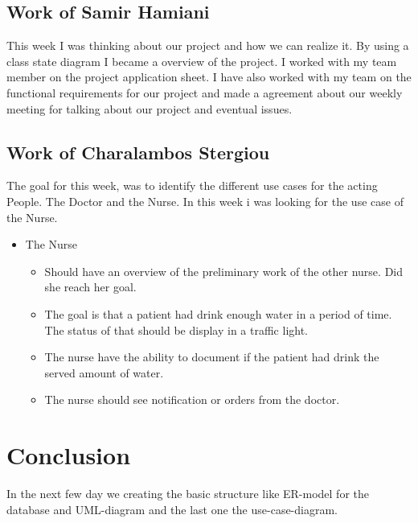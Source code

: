 \documentclass{scrartcl}
\begin{document}
\subsection{Work of Samir Hamiani}
This week I was thinking about our project and how we can realize it. By using a class state diagram I became a overview of the project. I worked with my team member on the project application sheet. I have also worked with my team on the functional requirements for our project and made a agreement about our weekly meeting for talking about our project and eventual issues.
%
\subsection{Work of Charalambos Stergiou}
The goal for this week, was to identify the different use cases for the acting People. The Doctor and the Nurse. In this week i was looking for the use case of the Nurse. 
\begin{itemize}
\item The Nurse
\begin{itemize}
\item Should have an overview of the preliminary work of the other nurse. Did she reach her goal.
\item The goal is that a patient had drink enough water in a period of time. The status of that should be display in a traffic light.
\item The nurse have the ability to document if the patient had drink the served amount of water.
\item The nurse should see notification or orders from the doctor.
 
\end{itemize}

\end{itemize}


\section{Conclusion}
In the next few day we creating the basic structure like ER-model for the database and UML-diagram and the last one the use-case-diagram.
\printbibliography

\end{document}
